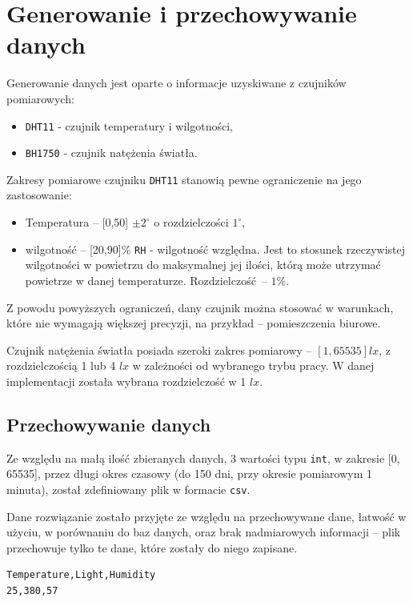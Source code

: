 \section{Generowanie i przechowywanie danych}
Generowanie danych jest oparte o informacje uzyskiwane z 
czujników pomiarowych:
\begin{itemize}
  \item \texttt{DHT11} - czujnik temperatury i wilgotności,
  \item \texttt{BH1750} - czujnik natężenia światła.
\end{itemize}
Zakresy pomiarowe czujniku \texttt{DHT11} stanowią pewne ograniczenie
na jego zastosowanie:
\begin{itemize}
  \item Temperatura -- [0,50] $\pm 2^\circ$ o rozdzielczości $1^\circ$,
  \item wilgotność -- [20,90]\% \texttt{RH} - wilgotność względna. 
    Jest to stosunek rzeczywistej wilgotności w powietrzu do maksymalnej jej ilości, 
    którą może utrzymać powietrze w danej temperaturze.
    Rozdzielczość -- $1\%$.
\end{itemize}
Z powodu powyższych ograniczeń, dany czujnik można stosować w warunkach, które
nie wymagają większej precyzji, na przykład -- pomieszczenia biurowe.

Czujnik natężenia światła posiada szeroki zakres pomiarowy -- $[1,65535] lx$,
z rozdzielczością 1 lub 4 $lx$ w zależności od wybranego trybu pracy. 
W danej implementacji została wybrana rozdzielczość w 1 $lx$.

\subsection{Przechowywanie danych}
Ze względu na małą ilość zbieranych danych, 3 wartości typu \texttt{int}, w zakresie
[0, 65535], przez długi okres czasowy (do 150 dni, przy okresie pomiarowym 1 minuta), 
został zdefiniowany plik w formacie \texttt{csv}.

Dane rozwiązanie zostało przyjęte ze względu na 
przechowywane dane, łatwość w użyciu, w porównaniu do baz danych, oraz 
brak nadmiarowych informacji -- plik przechowuje tylko te dane, 
które zostały do niego zapisane.

\begin{lstlisting}[frame=single, basicstyle=\ttfamily\small,
caption={Definicja pliku \texttt{csv} z przykładowymi danymi}]
Temperature,Light,Humidity
25,380,57
\end{lstlisting}

